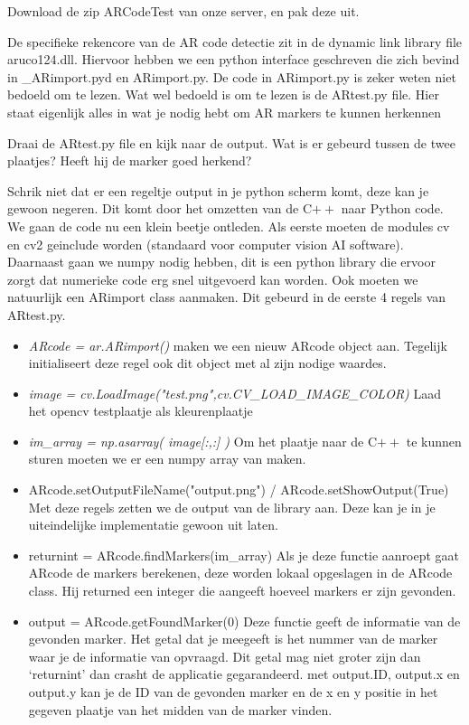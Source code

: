 \documentclass[a4paper]{article}
\begin{document}
\begin{Exercise}
Download de zip ARCodeTest van onze server, en pak deze uit.
\end{Exercise}
\vspace{10 mm}
De specifieke rekencore van de AR code detectie zit in de dynamic link library file aruco124.dll. Hiervoor hebben we een python interface geschreven die zich bevind in \_ARimport.pyd en ARimport.py. De code in ARimport.py is zeker weten niet bedoeld om te lezen. Wat wel bedoeld is om te lezen is de ARtest.py file. Hier staat eigenlijk alles in wat je nodig hebt om AR markers te kunnen herkennen

\begin{Exercise}
 Draai de ARtest.py file en kijk naar de output. Wat is er gebeurd tussen de twee plaatjes? Heeft hij de marker goed herkend?
\end{Exercise}
\vspace{10 mm}

Schrik niet dat er een regeltje output in je python scherm komt, deze kan je gewoon negeren. Dit komt door het omzetten van de C$\stackrel{}{++}$ naar Python code. 
We gaan de code nu een klein beetje ontleden. Als eerste moeten de modules cv en cv2 geinclude worden (standaard voor computer vision AI software). Daarnaast gaan we numpy nodig hebben, dit is een python library die ervoor zorgt dat numerieke code erg snel uitgevoerd kan worden. Ook moeten we natuurlijk een ARimport class aanmaken. Dit gebeurd in de eerste 4 regels van ARtest.py.
\begin{itemize}
\item \emph{ARcode = ar.ARimport()} maken we een nieuw ARcode object aan. Tegelijk initialiseert deze regel ook dit object met al zijn nodige waardes.
\item \emph{image = cv.LoadImage("test.png",cv.CV\_LOAD\_IMAGE\_COLOR)} Laad het opencv testplaatje als kleurenplaatje
\item \emph{im\_array = np.asarray( image[:,:] ) } Om het plaatje naar de C$\stackrel{}{++}$ te kunnen sturen moeten we er een numpy array van maken.
\item{ARcode.setOutputFileName("output.png") / ARcode.setShowOutput(True)} Met deze regels zetten we de output van de library aan. Deze kan je in je uiteindelijke implementatie gewoon uit laten.
\item{returnint = ARcode.findMarkers(im\_array)} Als je deze functie aanroept gaat ARcode de markers berekenen, deze worden lokaal opgeslagen in de ARcode class. Hij returned een integer die aangeeft hoeveel markers er zijn gevonden.
\item{output = ARcode.getFoundMarker(0)} Deze functie geeft de informatie van de gevonden marker. Het getal dat je meegeeft is het nummer van de marker waar je de informatie van opvraagd. Dit getal mag niet groter zijn dan `returnint' dan crasht de applicatie gegarandeerd. met output.ID, output.x en output.y kan je de ID van de gevonden marker en de x en y positie in het gegeven plaatje van het midden van de marker vinden.
\end{itemize}
\end{document}
